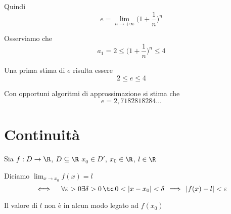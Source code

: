     Quindi \[
        e=\lim_{n\to + \infty} \biggl(1+\frac{1}{n}\biggr)^n
    \]

    Osserviamo che
    \[
      a_{1} = 2 \le \biggl(1+\frac{1}{n}\biggr)^n \le 4
    \]

    Una prima stima di $ e $ risulta essere
    \[
        2\le e \le 4
    \] 

    Con opportuni algoritmi di approssimazione si stima che
    \[
      e=2,7182818284\dots  
    \]




\section{Continuità}

Sia $ f:D\to \R $, $ D \subseteq \R $ $ x_{0} \in D'$, $ x_0 \in \R $, $ l \in \R $

Diciamo $ \lim_{x\to x_0} f(x) =l $
\[
  \iff\quad \forall \varepsilon>0 \exists \delta >0 \,\tc\, 0<|x-x_0|<\delta \,\implies\,|f(x)-l|<\varepsilon  
\]

Il valore di $ l $ non è in alcun modo legato ad $ f(x_0) $

